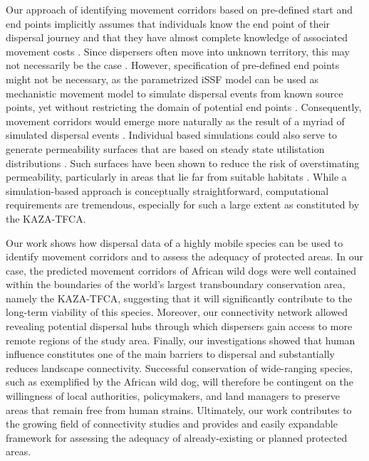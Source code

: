 \documentclass[abstract=on,10pt,a4paper,bibliography=totocnumbered]{article}
\begin{document}
Our approach of identifying movement corridors based on pre-defined start and
end points implicitly assumes that individuals know the end point of their
dispersal journey and that they have almost complete knowledge of associated
movement costs \citep{Panzacchi.2016}. Since dispersers often move into unknown
territory, this may not necessarily be the case \citep{Abrahms.2017,
Cozzi.2020}. However, specification of pre-defined end points might not be
necessary, as the parametrized iSSF model can be used as mechanistic movement
model to simulate dispersal events from known source points, yet without
restricting the domain of potential end points \citep{Signer.2017}.
Consequently, movement corridors would emerge more naturally as the result of a
myriad of simulated dispersal events \citep{Zeller.2020}. Individual based
simulations could also serve to generate permeability surfaces that are based on
steady state utilistation distributions \citep{Avgar.2016, Signer.2017}. Such
surfaces have been shown to reduce the risk of overstimating permeability,
particularly in areas that lie far from suitable habitats \cite{Signer.2017}.
While a simulation-based approach is conceptually straightforward, computational
requirements are tremendous, especially for such a large extent as constituted
by the KAZA-TFCA. 

Our work shows how dispersal data of a highly mobile species can be used to
 identify
movement corridors and to assess the adequacy of protected areas. In our case,
the predicted movement corridors of African wild dogs were well contained within
the boundaries of the world's largest transboundary conservation area, namely
the KAZA-TFCA, suggesting that it will significantly contribute to the long-term
viability of this species. Moreover, our connectivity network allowed revealing
potential dispersal hubs through which dispersers gain access to more remote
regions of the study area. Finally, our investigations showed that human
influence constitutes one of the main barriers to dispersal and substantially
reduces landscape connectivity. Successful conservation of wide-ranging species,
such as exemplified by the African wild dog, will therefore be contingent on the
willingness of local authorities, policymakers, and land managers to preserve
areas that remain free from human strains. Ultimately, our work contributes to
the growing field of connectivity studies and provides and easily expandable
framework for assessing the adequacy of already-existing or planned protected
areas.
\end{document}

